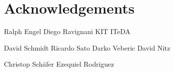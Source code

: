 
\chapter*{Acknowledgements}

Ralph Engel
Diego Ravignani
KIT ITeDA

David Schmidt
Ricardo Sato
Darko Veberic
David Nitz

Christop Schäfer
Ezequiel Rodriguez

